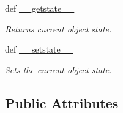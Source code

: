 \begin{DoxyCompactItemize}
def \hyperlink{class_mode_1_1_mode_afa8fd4a33bbaada7fe3a2a16a818c48f}{\_\-\_\-getstate\_\-\_\-}
\begin{DoxyCompactList}\small\item\em Returns current object state. \item\end{DoxyCompactList}\item 
def \hyperlink{class_mode_1_1_mode_a0b54ab72ab5d8fbbcba81dc953b3368a}{\_\-\_\-setstate\_\-\_\-}
\begin{DoxyCompactList}\small\item\em Sets the current object state. \item\end{DoxyCompactList}\end{DoxyCompactItemize}
\subsection*{Public Attributes}

